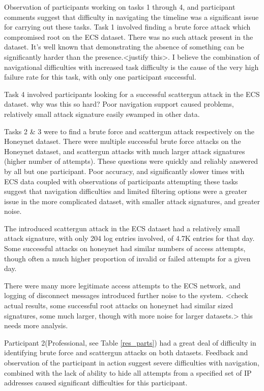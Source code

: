 Observation of participants working on tasks 1 through 4, and participant comments suggest that difficulty in navigating the timeline was a significant issue for carrying out these tasks.
Task 1 involved finding a brute force attack which compromised root on the ECS dataset. There was no such attack present in the dataset. It's well known that demonstrating the absence of something can be significantly harder than the presence.<justify this>. I believe the combination of navigational difficulties with increased task difficulty is the cause of the very high failure rate for this task, with only one participant successful.

Task 4 involved participants looking for a successful scattergun attack in the ECS dataset. why was this so hard? Poor navigation support caused problems, relatively small attack signature easily swamped in other data.

Tasks 2 \& 3 were to find a brute force and scattergun attack respectively on the Honeynet dataset.
There were multiple successful brute force attacks on the Honeynet dataset, and scattergun attacks with much larger attack signatures (higher number of attempts). These questions were quickly and reliably answered by all but one participant. Poor accuracy, and significantly slower times with ECS data coupled with observations of participants attempting these tasks suggest that navigation difficulties and limited filtering options were a greater issue in the more complicated dataset, with smaller attack signatures, and greater noise. 

The introduced scattergun attack in the ECS dataset had a relatively small attack signature, with only 204 log entries involved, of 4.7K entries for that day. Some successful attacks on honeynet had similar numbers of access attempts, though often a much higher proportion of invalid or failed attempts for a given day. 

There were many more legitimate access attempts to the ECS network, and logging of disconnect messages introduced further noise to the system. 
<check actual results, some successful root attacks on honeynet had similar sized signatures, some much larger, though with more noise for larger datasets.>
this needs more analysis.

Participant 2(Professional, see Table \ref{res_parts}) had a great deal of difficulty in identifying brute force and scattergun attacks on both datasets. Feedback and observation of the participant in action suggest severe difficulties with navigation, combined with the lack of ability to hide all attempts from a specified set of IP addresses caused significant difficulties for this participant.

